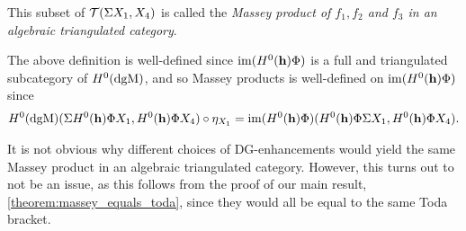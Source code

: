 \begin{definition}
    This subset of \( {\mathcal{T}}(\Sigma X_1, X_4) \) is called the \emph{Massey product of \( f_1, f_2 \) and \( f_3 \) in an algebraic triangulated category}.
\end{definition}

The above definition is well-defined since \( \operatorname{im}(H^0(\mathbf{h}) \Phi) \) is a full and triangulated subcategory of \( H^0(\operatorname{dgM}) \), and so Massey products is well-defined on \( \operatorname{im}(H^0(\mathbf{h}) \Phi) \) since
\begin{align*}
    H^0(\operatorname{dgM})(\Sigma H^0(\mathbf{h}) \Phi X_1, H^0(\mathbf{h}) \Phi X_4) \circ \eta_{X_1} = \operatorname{im}(H^0(\mathbf{h}) \Phi)(H^0(\mathbf{h}) \Phi \Sigma X_1, H^0(\mathbf{h}) \Phi X_4).
\end{align*}

It is not obvious why different choices of DG-enhancements would yield the same Massey product in an algebraic triangulated category. However, this turns out to not be an issue, as this follows from the proof of our main result, \autoref{theorem:massey_equals_toda}, since they would all be equal to the same Toda bracket.